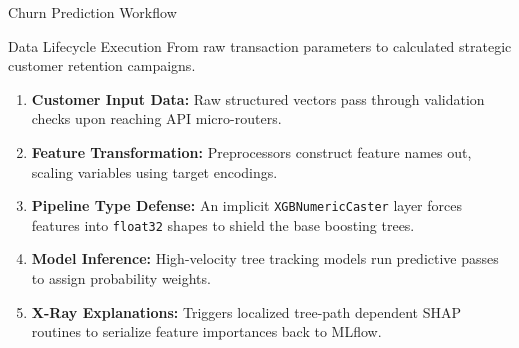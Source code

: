 \begin{frame}{Churn Prediction Workflow}
    \begin{alertblock}{Data Lifecycle Execution}
        From raw transaction parameters to calculated strategic customer retention campaigns.
    \end{alertblock}
    \begin{enumerate}\scriptsize
        \item \textbf{Customer Input Data:} Raw structured vectors pass through validation checks upon reaching API micro-routers.
        \item \textbf{Feature Transformation:} Preprocessors construct feature names out, scaling variables using target encodings.
        \item \textbf{Pipeline Type Defense:} An implicit \texttt{XGBNumericCaster} layer forces features into \texttt{float32} shapes to shield the base boosting trees.
        \item \textbf{Model Inference:} High-velocity tree tracking models run predictive passes to assign probability weights.
        \item \textbf{X-Ray Explanations:} Triggers localized tree-path dependent SHAP routines to serialize feature importances back to MLflow.
    \end{enumerate}
\end{frame}

